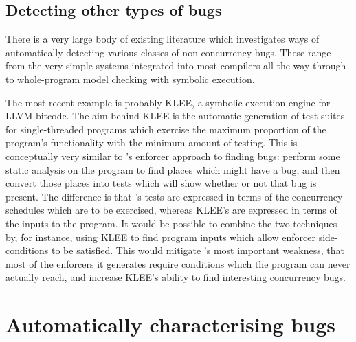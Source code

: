 \subsection{Detecting other types of bugs}
\label{sect:rw:detect_other}

There is a very large body of existing literature which investigates
ways of automatically detecting various classes of non-concurrency
bugs.  These range from the very simple systems integrated into most
compilers\needCite{} all the way through to whole-program model
checking with symbolic execution\needCite{}.  

The most recent example
is probably KLEE\cite{Cadar}, a symbolic execution engine for LLVM
bitcode\cite{Lattner2013}.  The aim behind KLEE is the automatic
generation of test suites for single-threaded programs which exercise
the maximum proportion of the program's functionality with the minimum
amount of testing.  This is conceptually very similar to
{\technique}'s enforcer approach to finding bugs: perform some static
analysis on the program to find places which might have a bug, and
then convert those places into tests which will show whether or not
that bug is present.  The difference is that {\technique}'s tests are
expressed in terms of the concurrency schedules which are to be
exercised, whereas KLEE's are expressed in terms of the inputs to the
program.  It would be possible to combine the two techniques by, for
instance, using KLEE to find program inputs which allow {\technique}
enforcer side-conditions to be satisfied.  This would mitigate
{\technique}'s most important weakness, that most of the enforcers it
generates require conditions which the program can never actually
reach, and increase KLEE's ability to find interesting concurrency
bugs.




\section{Automatically characterising bugs}

